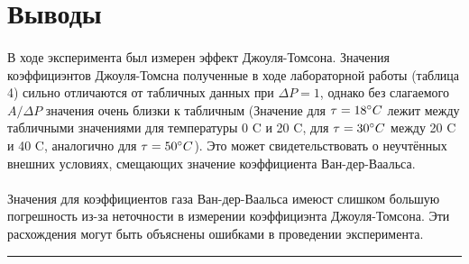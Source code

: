 \documentclass[a4paper,12pt]{article} %
\begin{document}
\section{Выводы}
\paragraph{}
В ходе эксперимента был измерен эффект Джоуля-Томсона. Значения коэффициэнтов Джоуля-Томсна полученные в ходе лабораторной работы (таблица 4) сильно отличаются от табличных данных при $\Delta P = 1$, однако без слагаемого $A / \Delta P$ значения очень близки к табличным (Значение для $\tau = 18 \degree C$ лежит между табличными значениями для температуры 0 \degree C и 20 \degree C, для $\tau = 30 \degree C$  между 20 \degree C и 40 \degree C, аналогично для $\tau = 50 \degree C$). Это может свидетельствовать о неучтённых внешних условиях, смещающих значение коэффициента Ван-дер-Ваальса. 

\paragraph{}
Значения для коэффициентов газа Ван-дер-Ваальса имеюст слишком большую погрешность из-за неточности в измерении коэффициэнта Джоуля-Томсона. Эти расхождения могут быть объяснены ошибками в проведении эксперимента. 
\medskip\hrule\medskip
\end{document}
